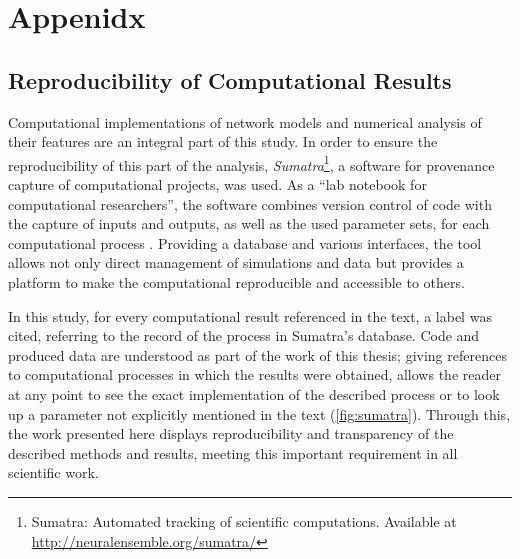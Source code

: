 



\chapter{Appenidx}





\section{Reproducibility of Computational Results}\label{sec:reproducibility}

Computational implementations of network models and numerical analysis
of their features are an integral part of this study. In order to
ensure the reproducibility of this part of the analysis,
\textit{Sumatra}\footnote{Sumatra: Automated tracking of scientific
  computations. Available at
  \url{http://neuralensemble.org/sumatra/}}, a software for provenance
capture of computational projects, was used. As a \enquote{lab
  notebook for computational researchers}, the software combines
version control of code with the capture of inputs and outputs, as
well as the used parameter sets, for each computational
process \parencite{Sumatra2012}. Providing a database and various
interfaces, the tool allows not only direct management of simulations
and data but provides a platform to make the computational
reproducible and accessible to others.



In this study, for every computational result referenced
 in the text, a label was
cited, referring to the record of the process in Sumatra's
database. Code and produced data are understood as part of the work of
this thesis; giving references to computational processes in which the
results were obtained, allows the reader at any point to see the exact
implementation of the described process or to look up a parameter not
explicitly mentioned in the text (\autoref{fig:sumatra}). Through
this, the work presented here displays reproducibility and
transparency of the described methods and results, meeting this
important requirement in all scientific work.

